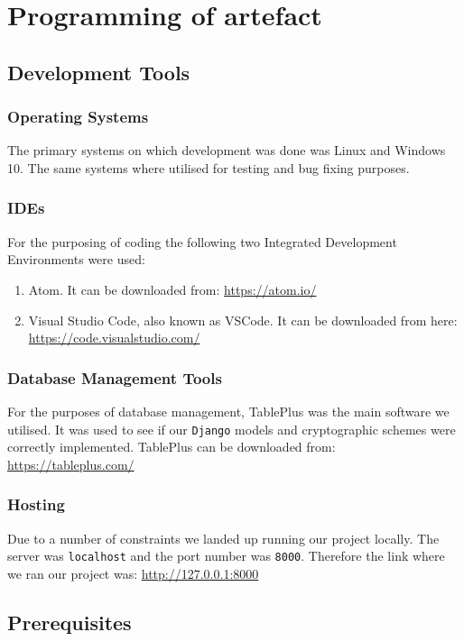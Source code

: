 \documentclass[a4paper, 12pt, titlepage]{report}
\begin{document}
\chapter{Programming of artefact}
\section{Development Tools}
\subsection{Operating Systems}
The primary systems on which development was done was Linux and Windows 10. The same systems where utilised for testing and bug fixing purposes.
\subsection{IDEs}
For the purposing of coding the following two Integrated Development Environments were used:
\begin{enumerate}
\item Atom. It can be downloaded from: \url{https://atom.io/}
\item Visual Studio Code, also known as VSCode. It can be downloaded from here: \url{https://code.visualstudio.com/}
\end{enumerate}
\subsection{Database Management Tools}
For the purposes of database management, TablePlus was the main software we utilised. It was used to see if our \texttt{Django} models and cryptographic schemes were correctly implemented. TablePlus can be downloaded from: \url{https://tableplus.com/}
\subsection{Hosting}
Due to a number of constraints we landed up running our project locally. The server was \texttt{localhost} and the port number was \texttt{8000}. Therefore the link where we ran our project was:
\url{http://127.0.0.1:8000}
\section{Prerequisites}
\end{document}
